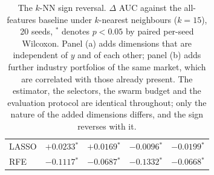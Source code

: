 \begin{table}[htbp]
\begin{tabular}{lrrrrrrrr}
    LASSO & \multicolumn{2}{c}{$+0.0233$$^{*}$} & \multicolumn{2}{c}{$+0.0169$$^{*}$} & \multicolumn{2}{c}{$-0.0096$$^{*}$} & \multicolumn{2}{c}{$-0.0199$$^{*}$} \\
    RFE & \multicolumn{2}{c}{$-0.1117$$^{*}$} & \multicolumn{2}{c}{$-0.0687$$^{*}$} & \multicolumn{2}{c}{$-0.1332$$^{*}$} & \multicolumn{2}{c}{$-0.0668$$^{*}$} \\
    \hline
    \end{tabular}
    \caption{The $k$-NN sign reversal. $\Delta$ AUC against the all-features baseline under $k$-nearest neighbours ($k = 15$), 20 seeds, $^{*}$ denotes $p < 0.05$ by paired per-seed Wilcoxon. Panel (a) adds dimensions that are independent of $y$ and of each other; panel (b) adds further industry portfolios of the same market, which are correlated with those already present. The estimator, the selectors, the swarm budget and the evaluation protocol are identical throughout; only the nature of the added dimensions differs, and the sign reverses with it.}
    \label{tab:knnirrelevance}
\end{table}
